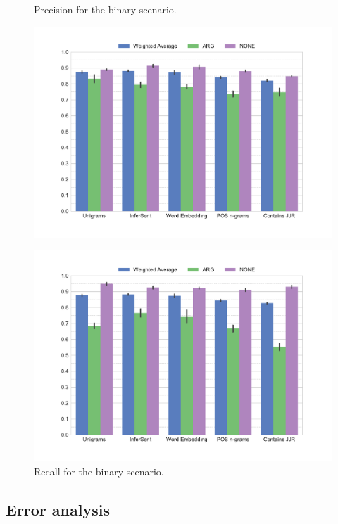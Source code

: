 \begin{figure}[h]
    \begin{minipage}{.5\linewidth}
   \caption{Precision for the binary scenario.} 
    \label{tbl:3_conf_inf}
 \centering
	\includegraphics[width=1\linewidth]{images/experiments/precision-True}
  \end{minipage} 
    \begin{minipage}{.5\linewidth}
  
     \caption{Recall for the binary scenario.} 
       \label{tbl:3_conf_uni}
 \centering
	\includegraphics[width=1\linewidth]{images/experiments/recall-True}
    \end{minipage} 
\end{figure}



\subsection{Error analysis}

